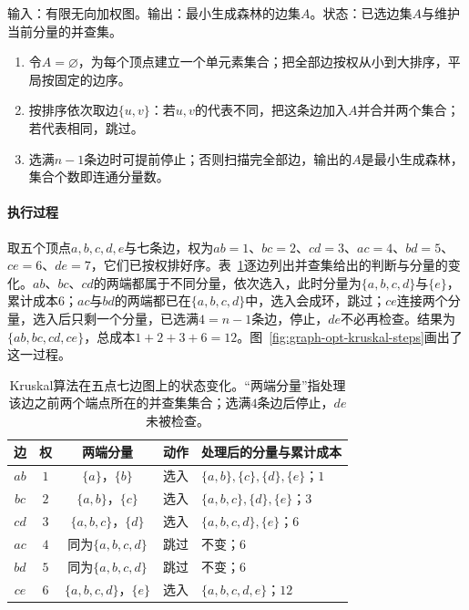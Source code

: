 \begin{algorithm}[Kruskal算法]
\label{alg:graph-opt-kruskal}
输入：有限无向加权图。输出：最小生成森林的边集$A$。状态：已选边集$A$与维护当前分量的并查集。
\begin{enumerate}
  \item 令$A=\varnothing$，为每个顶点建立一个单元素集合；把全部边按权从小到大排序，平局按固定的边序。
  \item 按排序依次取边$\{u,v\}$：若$u,v$的代表不同，把这条边加入$A$并合并两个集合；若代表相同，跳过。
  \item 选满$n-1$条边时可提前停止；否则扫描完全部边，输出的$A$是最小生成森林，集合个数即连通分量数。
\end{enumerate}
\end{algorithm}

\paragraph{执行过程}
取五个顶点$a,b,c,d,e$与七条边，权为$ab=1$、$bc=2$、$cd=3$、$ac=4$、$bd=5$、$ce=6$、$de=7$，它们已按权排好序。表~\ref{tab:graph-opt-kruskal-trace}逐边列出并查集给出的判断与分量的变化。$ab$、$bc$、$cd$的两端都属于不同分量，依次选入，此时分量为$\{a,b,c,d\}$与$\{e\}$，累计成本$6$；$ac$与$bd$的两端都已在$\{a,b,c,d\}$中，选入会成环，跳过；$ce$连接两个分量，选入后只剩一个分量，已选满$4=n-1$条边，停止，$de$不必再检查。结果为$\{ab,bc,cd,ce\}$，总成本$1+2+3+6=12$。图~\ref{fig:graph-opt-kruskal-steps}画出了这一过程。

\begin{table}[!htb]
  \centering
  \caption{Kruskal算法在五点七边图上的状态变化。“两端分量”指处理该边之前两个端点所在的并查集集合；选满$4$条边后停止，$de$未被检查。}
  \label{tab:graph-opt-kruskal-trace}
  \begin{tabular}{@{}cccll@{}}
    \toprule
    边 & 权 & 两端分量 & 动作 & 处理后的分量与累计成本 \\
    \midrule
    $ab$ & $1$ & $\{a\}$，$\{b\}$ & 选入 & $\{a,b\},\{c\},\{d\},\{e\}$；$1$ \\
    $bc$ & $2$ & $\{a,b\}$，$\{c\}$ & 选入 & $\{a,b,c\},\{d\},\{e\}$；$3$ \\
    $cd$ & $3$ & $\{a,b,c\}$，$\{d\}$ & 选入 & $\{a,b,c,d\},\{e\}$；$6$ \\
    $ac$ & $4$ & 同为$\{a,b,c,d\}$ & 跳过 & 不变；$6$ \\
    $bd$ & $5$ & 同为$\{a,b,c,d\}$ & 跳过 & 不变；$6$ \\
    $ce$ & $6$ & $\{a,b,c,d\}$，$\{e\}$ & 选入 & $\{a,b,c,d,e\}$；$12$ \\
    \bottomrule
  \end{tabular}
\end{table}


